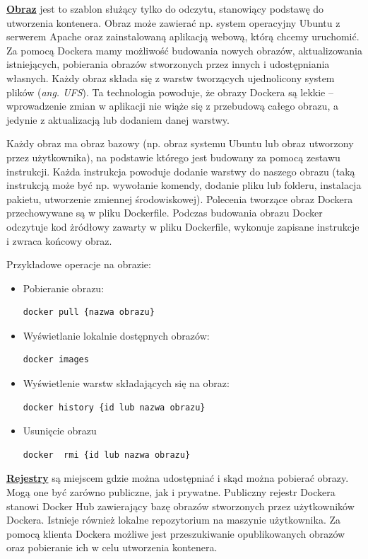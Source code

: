 	\textbf{\underline{Obraz}} jest to szablon służący tylko do odczytu, stanowiący podstawę do utworzenia kontenera. Obraz może zawierać np. system operacyjny Ubuntu z serwerem Apache oraz zainstalowaną aplikacją webową, którą chcemy uruchomić. Za pomocą Dockera mamy możliwość budowania nowych obrazów, aktualizowania istniejących, pobierania obrazów stworzonych przez innych i udostępniania własnych. Każdy obraz składa się z warstw tworzących ujednolicony system plików (\textit{ang. UFS}).  Ta technologia powoduje, że obrazy Dockera są lekkie – wprowadzenie zmian w aplikacji nie wiąże się z przebudową całego obrazu, a jedynie z aktualizacją lub dodaniem danej warstwy.
	
	Każdy obraz ma obraz bazowy (np. obraz systemu Ubuntu lub obraz utworzony przez użytkownika), na podstawie którego jest budowany za pomocą zestawu instrukcji. Każda instrukcja powoduje dodanie warstwy do naszego obrazu (taką instrukcją może być np. wywołanie komendy, dodanie pliku lub folderu, instalacja pakietu, utworzenie zmiennej środowiskowej). Polecenia tworzące obraz Dockera przechowywane są w pliku Dockerfile. Podczas budowania obrazu Docker odczytuje kod żródłowy zawarty w pliku Dockerfile, wykonuje zapisane instrukcje i zwraca końcowy obraz.

Przykładowe operacje na obrazie:
\begin{itemize}
\item Pobieranie obrazu:
\begin{lstlisting}[style=incode]
docker pull {nazwa obrazu}
\end{lstlisting}
\item Wyświetlanie lokalnie dostępnych obrazów:
\begin{lstlisting}[style=incode]
docker images
\end{lstlisting}
\item Wyświetlenie warstw składających się na obraz:
\begin{lstlisting}[style=incode]
docker history {id lub nazwa obrazu}
\end{lstlisting}
\item Usunięcie obrazu
\begin{lstlisting}[style=incode]
docker  rmi {id lub nazwa obrazu}
\end{lstlisting}
	
\end{itemize}

	\textbf{\underline{Rejestry}} są miejscem gdzie można udostępniać i skąd można pobierać obrazy. Mogą one być zarówno publiczne, jak i prywatne.  Publiczny rejestr Dockera stanowi Docker Hub zawierający bazę obrazów stworzonych przez użytkowników Dockera. Istnieje również lokalne repozytorium na maszynie użytkownika. Za pomocą klienta Dockera możliwe jest przeszukiwanie opublikowanych obrazów oraz pobieranie ich w celu utworzenia kontenera. 
	
